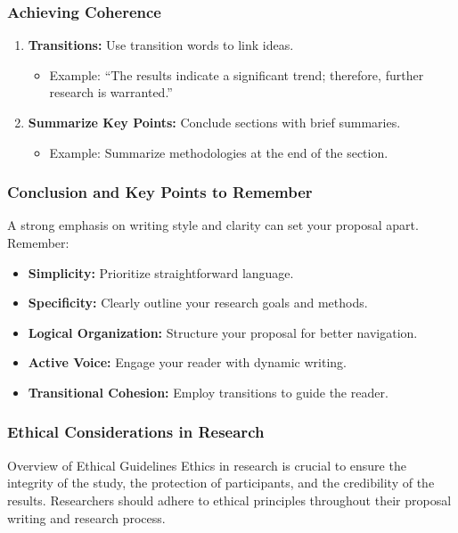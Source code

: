 \documentclass[aspectratio=169]{beamer}
\begin{document}
\begin{frame}[fragile]
    \frametitle{Achieving Coherence}
    \begin{enumerate}
        \item \textbf{Transitions:} Use transition words to link ideas.
             \begin{itemize}
                \item Example: “The results indicate a significant trend; therefore, further research is warranted.”
             \end{itemize}
        \item \textbf{Summarize Key Points:} Conclude sections with brief summaries.
             \begin{itemize}
                \item Example: Summarize methodologies at the end of the section.
             \end{itemize}
    \end{enumerate}
\end{frame}

\begin{frame}[fragile]
    \frametitle{Conclusion and Key Points to Remember}
    A strong emphasis on writing style and clarity can set your proposal apart. Remember:
    \begin{itemize}
        \item \textbf{Simplicity:} Prioritize straightforward language.
        \item \textbf{Specificity:} Clearly outline your research goals and methods.
        \item \textbf{Logical Organization:} Structure your proposal for better navigation.
        \item \textbf{Active Voice:} Engage your reader with dynamic writing.
        \item \textbf{Transitional Cohesion:} Employ transitions to guide the reader.
    \end{itemize}
\end{frame}

\begin{frame}[fragile]
    \frametitle{Ethical Considerations in Research}
    \begin{block}{Overview of Ethical Guidelines}
        Ethics in research is crucial to ensure the integrity of the study, the protection of participants, and the credibility of the results. 
        Researchers should adhere to ethical principles throughout their proposal writing and research process.
    \end{block}
\end{frame}
\end{document}
